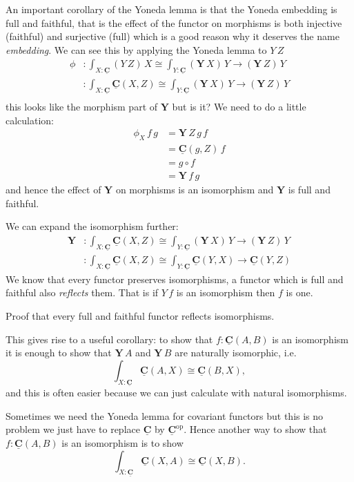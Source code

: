\documentclass{article}
\newcommand{\cat}[1]{\underline{\mathbf{#1}}}
\newcommand{\homC}[3]{\cat{#1}(#2,#3)}
\newcommand{\op}{\mathrm{op}}
\newcommand{\Y}{\mathbf{Y}}
\begin{document}
An important corollary of the Yoneda lemma is that the Yoneda embedding is full and faithful, that is the effect of the functor on morphisms is both injective (faithful) and surjective (full) which is a good reason why it deserves the name \emph{embedding}. We can see this by applying the Yoneda lemma to $Y\,Z$
\begin{align*}
  \phi & : \int_{X:\cat{C}} (Y\,Z)\,X \cong \int_{Y : \cat{C}} (\Y\,X)\,Y \to (\Y\,Z)\,Y \\
         & : \int_{X:\cat{C}} \homC{C}{X}{Z} \cong \int_{Y : \cat{C}} (\Y\,X)\,Y \to (\Y\,Z)\,Y \\
\end{align*}
this looks like the morphism part of $\Y$ but is it? We need to do a little calculation:
\begin{align*}
\phi_X\,f\,g & = \Y\,Z\,g\,f\\
& = \homC{C}{g}{Z}\,f\\
& = g \circ f \\
& = \Y\,f\,g
\end{align*}
and hence the effect of $\Y$ on morphisms is an isomorphism and $\Y$ is full and faithful. 

We can expand the isomorphism further:
\begin{align*}
\Y      & : \int_{X:\cat{C}} \homC{C}{X}{Z} \cong \int_{Y : \cat{C}} (\Y\,X)\,Y \to (\Y\,Z)\,Y \\
         & : \int_{X:\cat{C}} \homC{C}{X}{Z} \cong \int_{Y : \cat{C}} \homC{C}{Y}{X}\to \homC{C}{Y}{Z}
\end{align*}
We know that every functor preserves isomorphisms, a functor which is full and faithful also \emph{reflects} them. That is if $Y\,f$ is an isomorphism then $f$ is one. 
\begin{Exercise}
  Proof that every full and faithful functor reflects isomorphisms. 
\end{Exercise}
This gives rise to a useful corollary: to show that $f : \homC{C}{A}{B}$ is an isomorphism it is enough to show that $\Y\,A$ and $\Y\,B$ are naturally isomorphic, i.e.
\[ \int_{X:\cat{C}} \homC{C}{A}{X} \cong \homC{C}{B}{X} ,\]
and this is often easier because we can just calculate with natural isomorphisms.

Sometimes we need the Yoneda lemma for covariant functors but this is no problem we just have to replace $\cat{C}$ by $\cat{C}^\op$. Hence another way to show that $f:\homC{C}{A}{B}$ is an isomorphism is to show
\[ \int_{X:\cat{C}} \homC{C}{X}{A} \cong \homC{C}{X}{B}. \]
\end{document}
